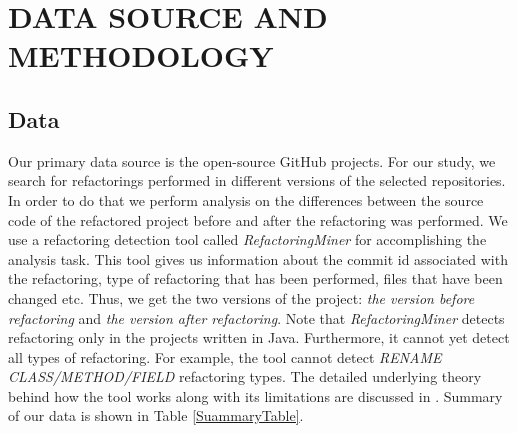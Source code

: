 \documentclass[conference]{IEEEtran}
\begin{document}
\section{DATA SOURCE AND METHODOLOGY} \label{Methodology}
\subsection{Data}
Our primary data source is the open-source GitHub projects. For our study, we search for refactorings performed in different versions of the selected repositories. In order to do that we perform analysis on the differences between the source code of the refactored project before and after the refactoring was performed. We use a refactoring detection tool called \textit{RefactoringMiner} \cite{Silva} for accomplishing the analysis task. This tool gives us information about the commit id associated with the refactoring, type of refactoring that has been performed, files that have been changed etc. Thus, we get the two versions of the project: \textit{the version before refactoring} and \textit{the version after refactoring}. Note that \textit{RefactoringMiner} detects refactoring only in the projects written in Java. Furthermore, it cannot yet detect all types of refactoring. For example, the tool cannot detect \textit{RENAME CLASS/METHOD/FIELD} refactoring types. The detailed underlying theory behind how the tool works along with its limitations are discussed in \cite{NikolaosTsantalis}. Summary of our data is shown in Table \ref{SuammaryTable}.
\end{document}
